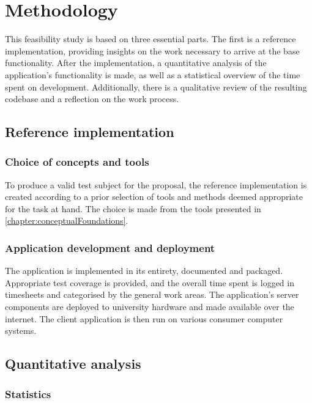\chapter{Methodology}
\label{chapter:methodology}

This feasibility study is based on three essential parts. The first is a reference implementation, providing insights on the work necessary to arrive at the base functionality. After the implementation, a quantitative analysis of the application's functionality is made, as well as a statistical overview of the time spent on development. Additionally, there is a qualitative review of the resulting codebase and a reflection on the work process.

\section{Reference implementation}

\subsection{Choice of concepts and tools}

To produce a valid test subject for the proposal, the reference implementation is created according to a prior selection of tools and methods deemed appropriate for the task at hand. The choice is made from the tools presented in \autoref{chapter:conceptualFoundations}.

\subsection{Application development and deployment}

The application is implemented in its entirety, documented and packaged. Appropriate test coverage is provided, and the overall time spent is logged in timesheets and categorised by the general work areas. The application's server components are deployed to university hardware and made available over the internet. The client application is then run on various consumer computer systems.

\section{Quantitative analysis}


\subsection{Statistics}

